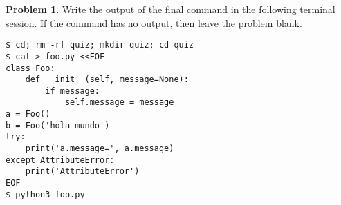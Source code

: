 \documentclass[10pt]{article}
\theoremstyle{definition}
\newtheorem{problem}{Problem}
\begin{document}
\filbreak
\begin{problem}
    Write the output of the final command in the following terminal session.
    If the command has no output, then leave the problem blank.
\end{problem}
\begin{lstlisting}
$ cd; rm -rf quiz; mkdir quiz; cd quiz
$ cat > foo.py <<EOF
class Foo:
    def __init__(self, message=None):
        if message:
            self.message = message
a = Foo()
b = Foo('hola mundo')
try:
    print('a.message=', a.message)
except AttributeError:
    print('AttributeError') 
EOF
$ python3 foo.py
\end{lstlisting}
\end{document}
